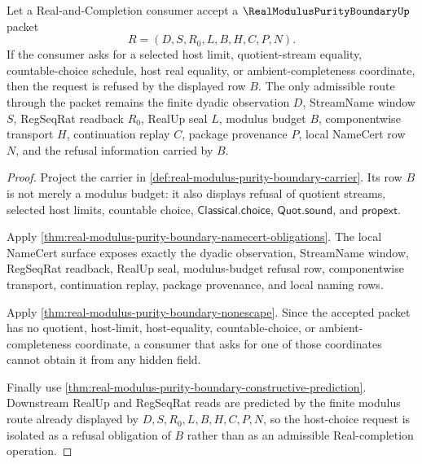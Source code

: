 \begin{theorem}
\label{thm:real-modulus-purity-boundary-host-choice-refusal}
Let a Real-and-Completion consumer accept a $\RealModulusPurityBoundaryUp$ packet
$$
R=(D,S,R_0,L,B,H,C,P,N).
$$
If the consumer asks for a selected host limit, quotient-stream equality, countable-choice schedule, host real equality, or ambient-completeness coordinate, then the request is refused by the displayed row $B$. The only admissible route through the packet remains the finite dyadic observation $D$, StreamName window $S$, RegSeqRat readback $R_0$, RealUp seal $L$, modulus budget $B$, componentwise transport $H$, continuation replay $C$, package provenance $P$, local NameCert row $N$, and the refusal information carried by $B$.
\end{theorem}
\begin{proof}
Project the carrier in \autoref{def:real-modulus-purity-boundary-carrier}. Its row $B$ is not merely a modulus budget: it also displays refusal of quotient streams, selected host limits, countable choice, $\mathsf{Classical.choice}$, $\mathsf{Quot.sound}$, and $\mathsf{propext}$.

Apply \autoref{thm:real-modulus-purity-boundary-namecert-obligations}. The local NameCert surface exposes exactly the dyadic observation, StreamName window, RegSeqRat readback, RealUp seal, modulus-budget refusal row, componentwise transport, continuation replay, package provenance, and local naming rows.

Apply \autoref{thm:real-modulus-purity-boundary-nonescape}. Since the accepted packet has no quotient, host-limit, host-equality, countable-choice, or ambient-completeness coordinate, a consumer that asks for one of those coordinates cannot obtain it from any hidden field.

Finally use \autoref{thm:real-modulus-purity-boundary-constructive-prediction}. Downstream RealUp and RegSeqRat reads are predicted by the finite modulus route already displayed by $D,S,R_0,L,B,H,C,P,N$, so the host-choice request is isolated as a refusal obligation of $B$ rather than as an admissible Real-completion operation.
\end{proof}

